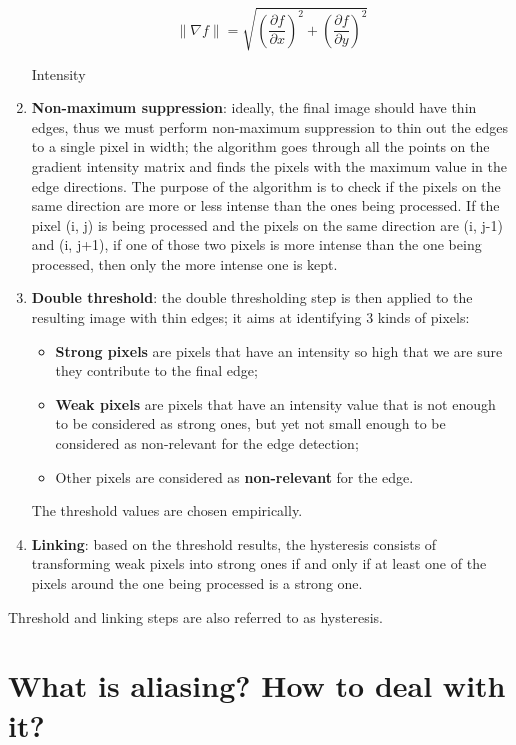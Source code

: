 \documentclass{article}
\begin{document}
\begin{enumerate}[start=0]
    \begin{equation*}
        \|\nabla f\| = \sqrt{\left( \frac{\partial f}{\partial x} \right)^2 + \left( \frac{\partial f}{\partial y} \right)^2}
    \end{equation*}
    \begin{center}
        Intensity
    \end{center}
    \item \textbf{Non-maximum suppression}: ideally, the final image should have thin edges, thus we must perform non-maximum suppression to thin out the edges to a single pixel in width; the algorithm goes through all the points on the gradient intensity matrix and finds the pixels with the maximum value in the edge directions. The purpose of the algorithm is to check if the pixels on the same direction are more or less intense than the ones being processed. If the pixel (i, j) is being processed and the pixels on the same direction are (i, j-1) and (i, j+1), if one of those two pixels is more intense than the one being processed, then only the more intense one is kept.
    \item \textbf{Double threshold}: the double thresholding step is then applied to the resulting image with thin edges;
    it aims at identifying 3 kinds of pixels:
    \begin{itemize}
        \item \textbf{Strong pixels} are pixels that have an intensity so high that we are sure they contribute to the final edge;
        \item \textbf{Weak pixels} are pixels that have an intensity value that is not enough to be considered as strong ones, but yet not small enough to be considered as non-relevant for the edge detection;
        \item Other pixels are considered as \textbf{non-relevant} for the edge.
    \end{itemize}
    The threshold values are chosen empirically.
    \item \textbf{Linking}: based on the threshold results, the hysteresis consists of transforming weak pixels into strong ones if and only if at least one of the pixels around the one being processed is a strong one.
    
\end{enumerate}

Threshold and linking steps are also referred to as hysteresis.

\newpage

\section*{What is aliasing? How to deal with it?}
 
\end{document}
